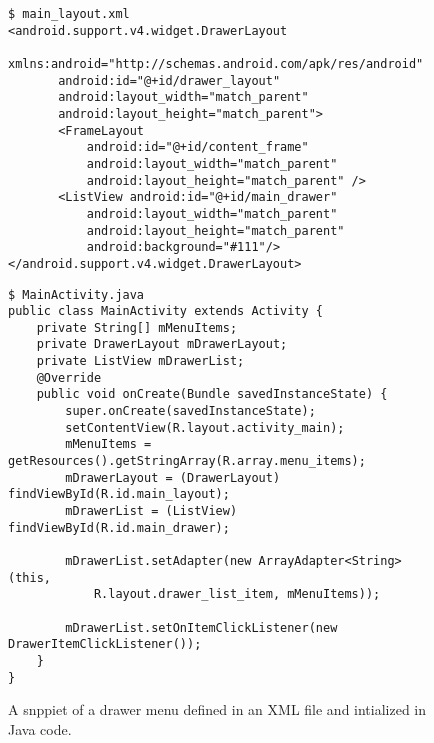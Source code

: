 \begin{figure} [ht]
	\centering

\begin{verbatim}
$ main_layout.xml
<android.support.v4.widget.DrawerLayout
       xmlns:android="http://schemas.android.com/apk/res/android"
       android:id="@+id/drawer_layout"
       android:layout_width="match_parent"
       android:layout_height="match_parent">
       <FrameLayout
           android:id="@+id/content_frame"
           android:layout_width="match_parent"
           android:layout_height="match_parent" />
       <ListView android:id="@+id/main_drawer"
           android:layout_width="match_parent"
           android:layout_height="match_parent"
           android:background="#111"/>
</android.support.v4.widget.DrawerLayout>
\end{verbatim}
\begin{verbatim}
$ MainActivity.java
public class MainActivity extends Activity {
    private String[] mMenuItems;
    private DrawerLayout mDrawerLayout;
    private ListView mDrawerList;
    @Override
    public void onCreate(Bundle savedInstanceState) {
        super.onCreate(savedInstanceState);
        setContentView(R.layout.activity_main);
        mMenuItems = getResources().getStringArray(R.array.menu_items);    
        mDrawerLayout = (DrawerLayout) findViewById(R.id.main_layout);
        mDrawerList = (ListView) findViewById(R.id.main_drawer);
        
        mDrawerList.setAdapter(new ArrayAdapter<String>(this,
            R.layout.drawer_list_item, mMenuItems));

        mDrawerList.setOnItemClickListener(new DrawerItemClickListener());
    }
}
\end{verbatim}
\caption{A snppiet of a drawer menu defined in an XML file and intialized in Java code.}
\label{fig:figure_ui_example}
\end{figure}